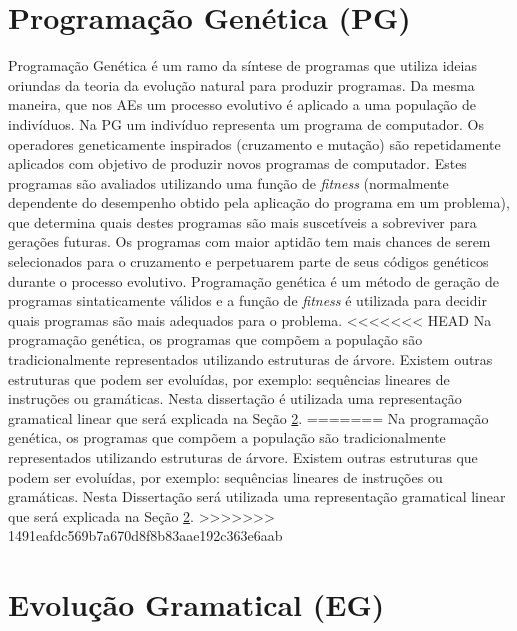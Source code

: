 \section{Programação Genética (PG)}
\label{subsection:PG}

Programação Genética \cite{burke2009exploring} é um ramo da síntese de programas que utiliza ideias oriundas da teoria da evolução natural para produzir programas. Da mesma maneira, que nos AEs um processo evolutivo é aplicado a uma população de indivíduos. Na PG um indivíduo representa um programa de computador. Os operadores geneticamente inspirados (cruzamento e mutação) são repetidamente aplicados com objetivo de produzir novos programas de computador. Estes programas são avaliados utilizando uma função de \textit{fitness} (normalmente dependente do desempenho obtido pela aplicação do programa em um problema), que determina quais destes programas são mais suscetíveis a sobreviver para gerações futuras. Os programas com maior aptidão tem mais chances de serem selecionados para o cruzamento e perpetuarem parte de seus códigos genéticos durante o processo evolutivo. 
Programação genética é um método de geração de programas sintaticamente válidos e a função de \textit{fitness} é utilizada para decidir quais programas são mais adequados para o problema.
<<<<<<< HEAD
Na programação genética, os programas que compõem a população são tradicionalmente representados utilizando estruturas de árvore. Existem outras estruturas que podem ser evoluídas, por exemplo: sequências lineares de instruções ou gramáticas. Nesta dissertação é utilizada uma representação gramatical linear que será explicada na Seção \ref{subsubsection:EvolucaoGramatical}.
=======
Na programação genética, os programas que compõem a população são tradicionalmente representados utilizando estruturas de árvore. Existem outras estruturas que podem ser evoluídas, por exemplo: sequências lineares de instruções ou gramáticas. Nesta  Dissertação será utilizada uma representação gramatical linear que será explicada na Seção \ref{subsubsection:EvolucaoGramatical}.
>>>>>>> 1491eafdc569b7a670d8f8b83aae192c363e6aab

\section{Evolução Gramatical (EG)}
\label{subsubsection:EvolucaoGramatical}


